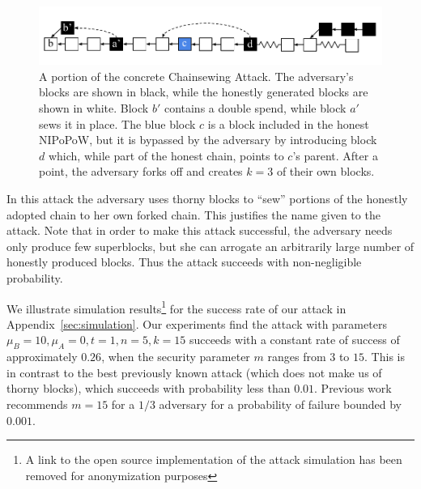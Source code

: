 \begin{figure}[h!]
	\begin{center}
		\includegraphics[width=\columnwidth]{figures/chainsew-concrete.pdf}
	\end{center}
	\caption{A portion of the concrete Chainsewing Attack. The adversary's blocks are shown in black, while the honestly generated blocks are shown in white. Block $b'$ contains a double spend, while block $a'$ sews it in place. The blue block $c$ is a block included in the honest NIPoPoW, but it is bypassed by the adversary by introducing block $d$ which, while part of the honest chain, points to $c$'s parent. After a point, the adversary forks off and creates $k = 3$ of their own blocks.}
	\label{fig:attack}
\end{figure}

In this attack the adversary uses thorny blocks to ``sew'' portions of the
honestly adopted chain to her own forked chain. This justifies the name given to
the attack.
Note that in order to make this attack successful, the adversary needs only
produce few superblocks, but she can arrogate an arbitrarily large number of
honestly produced blocks. Thus the attack succeeds with non-negligible
probability.

We illustrate simulation results\footnote{A link to the open source implementation of the attack simulation has been removed for anonymization purposes} for the success rate of our attack in Appendix~\ref{sec:simulation}. Our experiments find the attack with parameters $\mu_B = 10, \mu_A = 0, t = 1, n = 5, k = 15$ succeeds with a constant rate of success of approximately $0.26$, when the security parameter $m$ ranges from $3$ to $15$. This is in contrast to the best previously known attack (which does not make us of thorny blocks), which succeeds with probability less than $0.01$. Previous work recommends $m = 15$ for a $1/3$ adversary for a probability of failure bounded by $0.001$.
